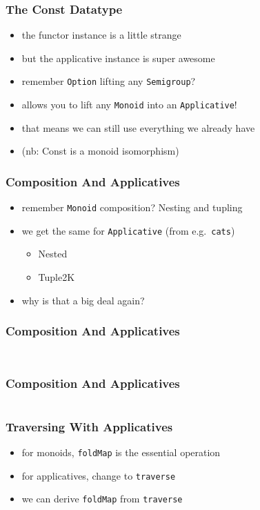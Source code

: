 \documentclass[aspectratio=169]{beamer}
\begin{document}
\begin{frame}
  \frametitle{The Const Datatype}
  \begin{itemize}
  \item the functor instance is a little strange
  \item but the applicative instance is super awesome
  \item remember \texttt{Option} lifting any \texttt{Semigroup}?
  \item allows you to lift any \texttt{Monoid} into an \texttt{Applicative}!
  \item that means we can still use everything we already have
  \item (nb: Const is a monoid isomorphism)
  \end{itemize}
\end{frame}

\begin{frame}
  \frametitle{Composition And Applicatives}
  \begin{itemize}
  \item remember \texttt{Monoid} composition? Nesting and tupling
  \item we get the same for \texttt{Applicative} (from e.g.\ \texttt{cats})
    \begin{itemize}
    \item Nested
    \item Tuple2K
    \end{itemize}
  \item why is that a big deal again?
  \end{itemize}
\end{frame}

\begin{frame}[fragile]
  \frametitle{Composition And Applicatives}
  \inputminted[fontsize=\small]{scala}{snippets/compose-applicative-monoid.scala}
  \inputminted[fontsize=\small]{scala}{snippets/compose-applicative-1.scala}
\end{frame}

\begin{frame}[fragile]
  \frametitle{Composition And Applicatives}
  \inputminted[fontsize=\small]{scala}{snippets/compose-applicative-2.scala}
\end{frame}

\begin{frame}
  \frametitle{Traversing With Applicatives}
  \begin{itemize}
  \item for monoids, \texttt{foldMap} is the essential operation
  \item for applicatives, change to \texttt{traverse}
  \item we can derive \texttt{foldMap} from \texttt{traverse}
  \end{itemize}
  \vspace{5mm}
  \inputminted[fontsize=\small]{scala}{snippets/traverse-def.scala}
\end{frame}
\end{document}
